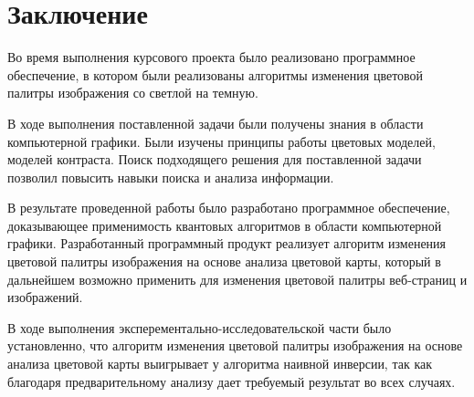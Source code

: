 \chapter*{Заключение}

Во время выполнения курсового проекта было реализовано программное обеспечение, в котором были реализованы алгоритмы изменения цветовой палитры изображения со светлой на темную.

В ходе выполнения поставленной задачи были получены знания в области компьютерной графики. Были изучены принципы работы цветовых моделей, моделей контраста. Поиск подходящего решения для поставленной задачи позволил повысить навыки поиска и анализа информации.

В результате проведенной работы было разработано программное обеспечение, доказывающее применимость квантовых алгоритмов в области компьютерной графики. Разработанный программный продукт реализует алгоритм изменения цветовой палитры изображения на основе анализа цветовой карты, который в дальнейшем возможно применить для изменения цветовой палитры веб-страниц и изображений.

В ходе выполнения эксперементально-исследовательской части было установленно, что алгоритм изменения цветовой палитры изображения на основе анализа цветовой карты выигрывает у алгоритма наивной инверсии, так как благодаря предварительному анализу дает требуемый результат во всех случаях.
